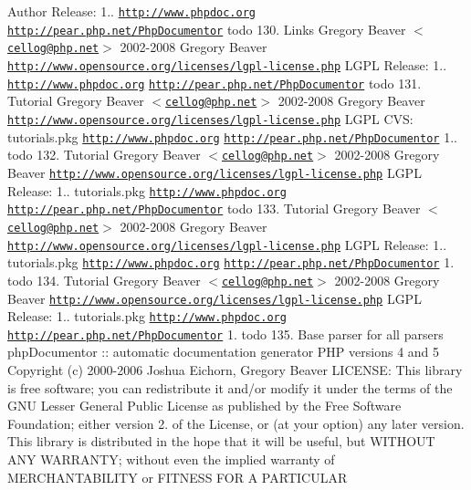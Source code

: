 \begin{DoxyAuthor}{\-Author}
\-Release\-: 1..  \href{http://www.phpdoc.org}{\tt http\-://www.\-phpdoc.\-org}  \href{http://pear.php.net/PhpDocumentor}{\tt http\-://pear.\-php.\-net/\-Php\-Documentor}  todo 130.   \-Links  \-Gregory \-Beaver $<$\href{mailto:cellog@php.net}{\tt cellog@php.\-net}$>$  2002-\/2008 \-Gregory \-Beaver  \href{http://www.opensource.org/licenses/lgpl-license.php}{\tt http\-://www.\-opensource.\-org/licenses/lgpl-\/license.\-php} \-L\-G\-P\-L  \-Release\-: 1..  \href{http://www.phpdoc.org}{\tt http\-://www.\-phpdoc.\-org}  \href{http://pear.php.net/PhpDocumentor}{\tt http\-://pear.\-php.\-net/\-Php\-Documentor}  todo 131.   \-Tutorial  \-Gregory \-Beaver $<$\href{mailto:cellog@php.net}{\tt cellog@php.\-net}$>$  2002-\/2008 \-Gregory \-Beaver  \href{http://www.opensource.org/licenses/lgpl-license.php}{\tt http\-://www.\-opensource.\-org/licenses/lgpl-\/license.\-php} \-L\-G\-P\-L  \-C\-V\-S\-:   tutorials.\-pkg  \href{http://www.phpdoc.org}{\tt http\-://www.\-phpdoc.\-org}  \href{http://pear.php.net/PhpDocumentor}{\tt http\-://pear.\-php.\-net/\-Php\-Documentor}  1..  todo 132.   \-Tutorial  \-Gregory \-Beaver $<$\href{mailto:cellog@php.net}{\tt cellog@php.\-net}$>$  2002-\/2008 \-Gregory \-Beaver  \href{http://www.opensource.org/licenses/lgpl-license.php}{\tt http\-://www.\-opensource.\-org/licenses/lgpl-\/license.\-php} \-L\-G\-P\-L  \-Release\-: 1..  tutorials.\-pkg  \href{http://www.phpdoc.org}{\tt http\-://www.\-phpdoc.\-org}  \href{http://pear.php.net/PhpDocumentor}{\tt http\-://pear.\-php.\-net/\-Php\-Documentor}  todo 133.   \-Tutorial  \-Gregory \-Beaver $<$\href{mailto:cellog@php.net}{\tt cellog@php.\-net}$>$  2002-\/2008 \-Gregory \-Beaver  \href{http://www.opensource.org/licenses/lgpl-license.php}{\tt http\-://www.\-opensource.\-org/licenses/lgpl-\/license.\-php} \-L\-G\-P\-L  \-Release\-: 1..  tutorials.\-pkg  \href{http://www.phpdoc.org}{\tt http\-://www.\-phpdoc.\-org}  \href{http://pear.php.net/PhpDocumentor}{\tt http\-://pear.\-php.\-net/\-Php\-Documentor}  1.  todo 134.   \-Tutorial  \-Gregory \-Beaver $<$\href{mailto:cellog@php.net}{\tt cellog@php.\-net}$>$  2002-\/2008 \-Gregory \-Beaver  \href{http://www.opensource.org/licenses/lgpl-license.php}{\tt http\-://www.\-opensource.\-org/licenses/lgpl-\/license.\-php} \-L\-G\-P\-L  \-Release\-: 1..  tutorials.\-pkg  \href{http://www.phpdoc.org}{\tt http\-://www.\-phpdoc.\-org}  \href{http://pear.php.net/PhpDocumentor}{\tt http\-://pear.\-php.\-net/\-Php\-Documentor}  1.  todo 135.  \-Base parser for all parsers  php\-Documentor \-:\-: automatic documentation generator  \-P\-H\-P versions 4 and 5  \-Copyright (c) 2000-\/2006 \-Joshua \-Eichorn, \-Gregory \-Beaver  \-L\-I\-C\-E\-N\-S\-E\-:  \-This library is free software; you can redistribute it and/or modify it under the terms of the \-G\-N\-U \-Lesser \-General \-Public \-License as published by the \-Free \-Software \-Foundation; either version 2. of the \-License, or (at your option) any later version.  \-This library is distributed in the hope that it will be useful, but \-W\-I\-T\-H\-O\-U\-T \-A\-N\-Y \-W\-A\-R\-R\-A\-N\-T\-Y; without even the implied warranty of \-M\-E\-R\-C\-H\-A\-N\-T\-A\-B\-I\-L\-I\-T\-Y or \-F\-I\-T\-N\-E\-S\-S \-F\-O\-R \-A \-P\-A\-R\-T\-I\-C\-U\-L\-A\-R 
\end{DoxyAuthor}
